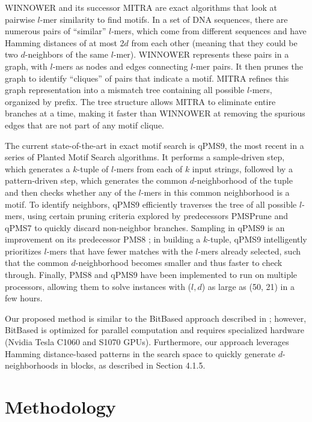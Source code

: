 \documentclass{acm_proc_article-sp}
\begin{document}
	WINNOWER \cite{pevzner2000combinatorial} and its successor MITRA \cite{eskin2002finding} are exact algorithms that look at pairwise $l$-mer similarity to find motifs. In a set of DNA sequences, there are numerous pairs of ``similar'' $l$-mers, which come from different sequences and have Hamming distances of at most 2$d$ from each other (meaning that they could be two $d$-neighbors of the same $l$-mer). WINNOWER represents these pairs in a graph, with $l$-mers as nodes and edges connecting $l$-mer pairs. It then prunes the graph to identify ``cliques'' of pairs that indicate a motif. MITRA refines this graph representation into a mismatch tree containing all possible $l$-mers, organized by prefix. The tree structure allows MITRA to eliminate entire branches at a time, making it faster than WINNOWER at removing the spurious edges that are not part of any motif clique.

	The current state-of-the-art in exact motif search is qPMS9, the most recent in a series \cite{pms2007,pms2014,pms2015} of Planted Motif Search algorithms. It performs a sample-driven step, which generates a $k$-tuple of $l$-mers from each of $k$ input strings, followed by a pattern-driven step, which generates the common $d$-neighborhood of the tuple and then checks whether any of the $l$-mers in this common neighborhood is a motif. To identify neighbors, qPMS9 efficiently traverses the tree of all possible $l$-mers, using certain pruning criteria explored by predecessors PMSPrune and qPMS7 \cite{pms2007} to quickly discard non-neighbor branches. Sampling in qPMS9 is an improvement on its predecessor PMS8 \cite{pms2014}; in building a $k$-tuple, qPMS9 intelligently prioritizes $l$-mers that have fewer matches with the $l$-mers already selected, such that the common $d$-neighborhood becomes smaller and thus faster to check through.  Finally, PMS8 and qPMS9 have been implemented to run on multiple processors, allowing them to solve instances with ($l, d$) as large as (50, 21) in a few hours.

	Our proposed method %
	is similar to the BitBased approach described in \cite{dasari2010efficient}; however, BitBased is optimized for parallel computation and requires specialized hardware (Nvidia Tesla C1060 and S1070 GPUs). Furthermore, our approach leverages Hamming distance-based patterns in the search space to quickly generate $d$-neighborhoods in blocks, as described in Section 4.1.5.

\section{Methodology}
\end{document}
